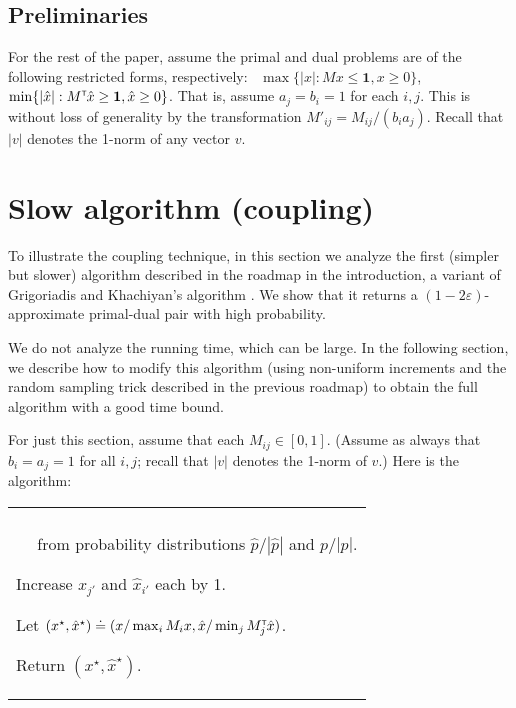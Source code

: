 \documentclass[11pt]{svjour3} \usepackage{fullpage}
\makeatletter
\newcommand{\primalOf}[1]{{{#1}}}
\newcommand{\dualOf}[1]{{\hat{#1}}}
\newcommand{\MM}{M}
\newcommand{\xp}{\primalOf x}
\newcommand{\pp}{\primalOf p}
\newcommand{\xd}{\dualOf x}
\newcommand{\pd}{\dualOf p}
\newcommand{\algfont}{}
\newcommand{\tab}{\hspace*{0.13in}}
\newcounter{myline}
\newenvironment{alg}{
  \medskip
  \par
  \algfont
  \centering
    \begin{tabular}{|@{$\!$}|l|}\hline
      \begin{minipage}{0.96\linewidth}\raggedright
          \smallskip
          \begin{list}{\arabic{myline}.}{
            \usecounter{myline}
            \setlength{\listparindent}{0in}
            \setlength{\topsep}{0in}
            \setlength{\itemsep}{.013in}
            \setlength{\parsep}{.013in}
            \setlength{\rightmargin}{0in}
            \setlength{\itemindent}{0in}
\setlength{\labelsep}{0.065in}
            \setlength{\leftmargin}{0.2in}
}
          }{
        \end{list}
        \smallskip
      \end{minipage}\\\hline
    \end{tabular}
    \par
    \noindent
}
\newcommand{\A}{\item}
\newcommand{\Ahead}[1]{\item[]\hspace*{-\leftmargin}{\textrm{#1}}}
\newcommand{\eps}{\varepsilon}
\newcommand{\tran}{^{\scriptscriptstyle \sf T\hspace*{-0.05em}}}
\newcommand{\rows}{r}
\newcommand{\columns}{c}
\makeatother
\begin{document}
\subsection{Preliminaries}
For the rest of the paper, 
assume the primal and dual problems are of the following restricted forms, respectively:
~$\max \{ |\xp| : \MM \xp \le \mathbf 1, \xp \ge  0 \}$,
~$\min \{ |\xd| : \MM\tran \xd \ge \mathbf 1, \xd \ge 0 \}$.
That is, assume $a_j = b_i = 1$ for each $i,j$.
This is without loss of generality by the transformation $\MM'_{ij}=\MM_{ij}/(b_ia_j)$.
Recall that $|v|$ denotes the 1-norm of any vector $v$.

\section{Slow algorithm (coupling)}\label{sec:slow_alg}\label{sec:alg}
To illustrate the coupling technique,
in this section we analyze the first (simpler but slower) algorithm described in the roadmap
in the introduction,
a variant of Grigoriadis and Khachiyan's algorithm \cite{Grigoriadis95Sublinear}.
We show that it returns a $(1-2\eps)$-approximate primal-dual pair with high probability.

We do not analyze the running time, which can be large.
In the following section, we describe how to modify this algorithm
(using non-uniform increments
and the random sampling trick described in the previous roadmap)
to obtain the full algorithm with a good time bound.

For just this section, assume that each $\MM_{ij}\in [0,1]$.
(Assume as always that $b_i = a_j = 1$ for all $i, j$;
recall that $|v|$ denotes the 1-norm of $v$.)
Here is the algorithm:

\noindent
\begin{alg}
\Ahead{\normalsize{\bf slow-alg}$(\MM\in[0,1]^{\rows\times \columns}, \eps)$ }

\A Vectors $\xp,\xd \leftarrow \mathbf 0$;
 scalar $N=\lceil 2\ln(\rows\columns)/\eps^2\rceil$.

\A {Repeat} until $\max_i \MM_i \xp \ge N$:

\A\tab Let $\pp_i \doteq (1+\eps)^{\MM_i \xp}$ (for all $i$)
and $\pd_j \doteq (1-\eps)^{\MM_j\tran \xd}$ (for all $j$).

\A \tab Choose random indices $j'$ and $i'$ respectively
\\\tab~~ from probability distributions $\pd/|\pd|$ and $\pp/|\pp|$.

\A \tab Increase $\xp_{j'}$ and $\xd_{i'}$ each by 1.

\A Let $(\xp^\star,\xd^\star) \doteq (\xp/\max_i \MM_i\xp, \xd/\min_j \MM_j\tran\xd)$.  \label{slow:scaling}

\A Return $(\xp^\star,\xd^\star)$.
\end{alg}
\end{document}
